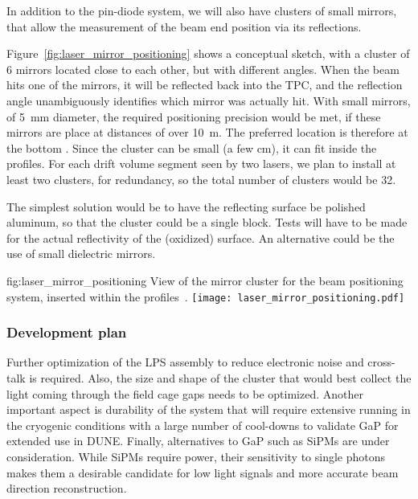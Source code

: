 In addition to the pin-diode system, we will also have clusters of small mirrors, that allow the measurement of the beam end position via its reflections.

Figure~\ref{fig:laser_mirror_positioning} shows a conceptual sketch, with a cluster of 6 mirrors located close to each other, but with different angles. When the beam hits one of the mirrors, it will be reflected back into the TPC, and the reflection angle unambiguously identifies which mirror was actually hit. With small mirrors, of \SI{5}{\milli\m} diameter, the required positioning precision would be met, if these mirrors are place at distances of over \SI{10}{\m}. The preferred location is therefore at the bottom . Since the cluster can be small (a few cm), it can fit inside the  profiles. For each drift volume segment seen by two lasers, we plan to install at least two clusters, for redundancy, so the total number of clusters would be \num{32}. 

The simplest solution would be to have the reflecting surface be polished aluminum, so that the cluster could be a single block. Tests will have to be made for the actual reflectivity of the (oxidized) surface. An alternative could be the use of small dielectric mirrors.

\begin{dunefigure}{fig:laser_mirror_positioning}
{View of the mirror cluster for the beam positioning system, inserted within the  profiles~\cite{bib:yu2019a}.}
\texttt{[image: laser\_mirror\_positioning.pdf]}
\end{dunefigure}

\subsubsection{Development plan}
 Further optimization of the LPS assembly to reduce electronic noise and cross-talk is required. Also, the size and shape of the cluster that would best collect the light coming through the field cage gaps needs to be optimized.  Another important aspect is durability of the system that will require extensive running in the cryogenic conditions with  a large number of cool-downs to validate GaP for extended use in DUNE. Finally, alternatives to GaP such as SiPMs are under consideration. While SiPMs require power, their sensitivity to single photons makes them a desirable candidate for low light signals and more accurate beam direction reconstruction. 
















